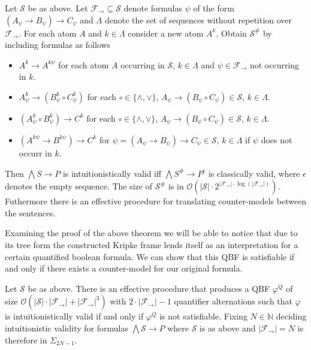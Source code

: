\documentclass[a4paper,UKenglish,cleveref, autoref, thm-restate]{lipics-v2021}
\begin{document}
\begin{theorem}
	Let $\mathcal S$ be as above. Let $\mathcal F_\to\subseteq\mathcal S$ denote formulas $\psi$ of the form $(A_\psi\to B_\psi)\to C_\psi$ and $\Lambda$ denote the set of sequences without repetition over $\mathcal F_\to$. For each atom $A$ and $k\in\Lambda$ consider a new atom $A^k$. Obtain $\mathcal S^\#$ by including formulas as follows
	\begin{itemize}
		\item $A^k\to A^{k\psi}$ for each atom $A$ occurring in $\mathcal S$, $k\in\Lambda$ and $\psi\in\mathcal F_\to$ not occurring in $k$.
		\item $A_\psi^k\to (B_\psi^k\circ C_\psi^k)$ for each $\circ\in\{\wedge,\vee\}$, $A_\psi\to (B_\psi\circ C_\psi)\in\mathcal S$, $k\in\Lambda$.
		\item $(A_\psi^k\circ B_\psi^k)\to C^k$ for each $\circ\in\{\wedge,\vee\}$, $A_\psi\to (B_\psi\circ C_\psi)\in\mathcal S$, $k\in\Lambda$.
		\item $(A^{k\psi}\to B^{k\psi})\to C^k$ for $\psi = (A_\psi\to B_\psi)\to C_\psi\in\mathcal S$, $k\in\Lambda$ if $\psi$ does not occurr in $k$.
	\end{itemize}
	Then $\bigwedge S\to P$ is intuitionistically valid iff $\bigwedge S^\#\to P^\epsilon$ is classically valid, where $\epsilon$ denotes the empty sequence. The size of $\mathcal S^\#$ is in $\mathcal O(|\mathcal S|\cdot2^{|\mathcal F_\to|\cdot\log(|\mathcal F_\to|)})$. Futhermore there is an effective procedure for translating counter-models between the sentences.
\end{theorem}

Examining the proof of the above theorem we will be able to notice that due to its tree form the constructed Kripke frame lends itself as an interpretation for a certain quantified boolean formula. We can show that this QBF is satisfiable if and only if there exists a counter-model for our original formula.

\begin{theorem}
	Let $\mathcal S$ be as above. There is an effective procedure that produces a QBF $\varphi^Q$ of size $\mathcal O(|\mathcal S|\cdot|\mathcal F_\to| + |\mathcal F_\to|^3)$ with $2\cdot |\mathcal F_\to|-1$ quantifier alternations such that $\varphi$ is intuitionistically valid if and only if $\varphi^Q$ is not satisfiable. Fixing $N\in\mathbb N$ deciding intuitionistic validity for formulas $\bigwedge \mathcal S\to P$ where $\mathcal S$ is as above and $|\mathcal F_\to| = N$ is therefore in $\Sigma_{2N-1}$.
\end{theorem}
\end{document}
